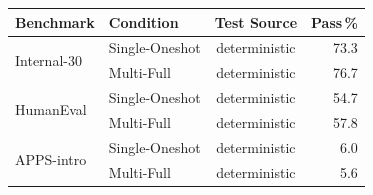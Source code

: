 \begin{tabular}{@{}llcr@{}}
\toprule
Benchmark & Condition & Test Source & Pass\,\% \\
\midrule
\multirow{2}{*}{Internal-30}
  & Single-Oneshot & deterministic & 73.3 \\
  & Multi-Full     & deterministic & 76.7 \\
\midrule
\multirow{2}{*}{HumanEval}
  & Single-Oneshot & deterministic & 54.7 \\
  & Multi-Full     & deterministic & 57.8 \\
\midrule
\multirow{2}{*}{APPS-intro}
  & Single-Oneshot & deterministic & 6.0 \\
  & Multi-Full     & deterministic & 5.6 \\
\bottomrule
\end{tabular}
